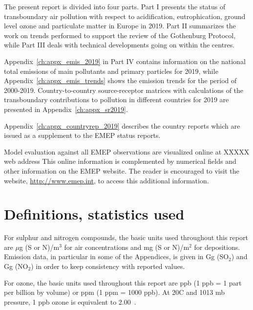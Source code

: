 The present report is divided into four parts. Part I presents the status
of transboundary air pollution with respect to acidification, eutrophication,
ground level ozone and particulate matter in Europe in 2019.
Part II summarizes the work on trends performed to support the review of the Gothenburg Protocol, while Part III deals with technical developments going on within the centres.

Appendix~\ref{ch:appx_emis_2019} in Part IV contains information on the national total emissions of main pollutants and  primary particles for 2019, while Appendix~\ref{ch:appx_emis_trends} shows the  emission trends for the period of 2000-2019. Country-to-count\-ry source-receptor matrices with calculations of
the transboundary contributions to pollution in different countries
for 2019 are presented in Appendix~\ref{ch:appx_sr2019}.

Appendix~\ref{ch:appx_countryrep_2019} describes the country
reports which are  issued as a supplement to the EMEP status reports.

Model evaluation against all EMEP observations are visualized online at XXXXX web address
This online information is complemented by numerical fields and other
information on the EMEP website. The reader is encouraged to visit the
website, \url{http://www.emep.int}, to access this additional information.



\section{Definitions, statistics used}
\label{DEFS}

For sulphur and nitrogen compounds, the basic units used throughout
this report are $\mu$g (S or N)/m$^{3}$ for air concentrations and
mg (S or N)/m$^{2}$ for depositions. Emission data, in particular in
some of the Appendices, is given in Gg (SO$_2$)  and Gg (NO$_2$) in
order to keep consistency with reported values.

For ozone, the basic units used throughout this report are ppb (1 ppb
= 1 part per billion by volume) or ppm (1 ppm = 1000 ppb).  At
20\degrees C and 1013 mb pressure, 1 ppb ozone is equivalent to
2.00~\ug.  \vspace{0.5cm}

